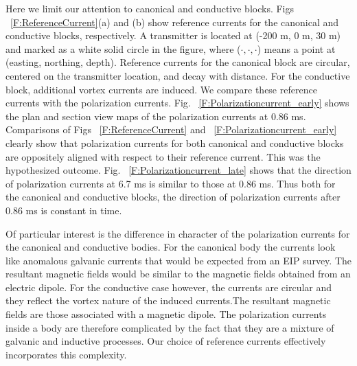 \documentclass[extra,mreferee]{gji}
\begin{document}
Here we limit our attention to canonical and conductive blocks. 
Figs ~\ref{F:ReferenceCurrent}(a)   and (b) show reference currents for the canonical and conductive blocks, respectively. 
A transmitter is located at (-200 m, 0 m, 30 m) and marked as a white solid circle in the figure, where ($\cdot, \cdot, \cdot$) means a point at (easting, northing, depth).
Reference currents for the canonical block are circular, centered on the transmitter location, and decay with distance. 
For the conductive block, additional vortex currents are induced.
We compare these reference currents with the polarization currents. 
Fig. ~\ref{F:Polarizationcurrent_early} shows the plan and section view maps of the polarization currents at 0.86 ms.
Comparisons of Figs ~\ref{F:ReferenceCurrent} and ~\ref{F:Polarizationcurrent_early} clearly show that polarization currents for both canonical and conductive blocks are oppositely aligned with respect to their reference current. This was the hypothesized outcome.
Fig. ~\ref{F:Polarizationcurrent_late} shows that the direction of polarization currents at 6.7 ms is similar to those at 0.86 ms. Thus both for the canonical and conductive blocks, the direction of polarization currents after 0.86 ms is constant in time. 

Of  particular interest is the difference in character of the polarization currents for the canonical and conductive bodies. For the canonical body the currents look like anomalous galvanic currents that would be expected from an EIP survey. The resultant magnetic fields would be similar to the magnetic fields obtained from an electric dipole. For the conductive case however, the currents are circular and they reflect the vortex nature of the induced currents.The resultant magnetic fields are those associated with a magnetic dipole. The polarization currents inside a body are therefore complicated by the fact that they are a mixture of galvanic and inductive processes. Our choice of reference currents effectively incorporates this complexity. 



\end{document}
